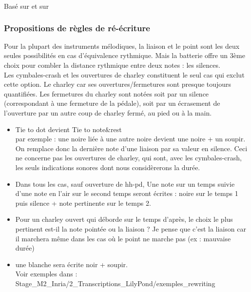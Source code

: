Basé sur \cite{jacquemard:hal-01134096} et sur \cite{jacquemard:hal-01403982}
\subsubsection*{Propositions de règles de ré-écriture}
Pour la plupart des instruments mélodiques, la liaison et le point sont les deux seules possibilités en cas d’équivalence rythmique. Mais la batterie offre un 3ème choix pour combler la distance rythmique entre deux notes : les silences.\\Les cymbales-crash et les ouvertures de charley constituent le seul cas qui exclut cette option. Le charley car ses ouvertures/fermetures sont presque toujours quantifiées. Les fermetures du charley sont notées soit par un silence (correspondant à une fermeture de la pédale), soit par un écrasement de l’ouverture par un autre coup de charley fermé, au pied ou à la main.
\begin{itemize}
\item 
Tie to dot devient Tie to note\&rest\\
par exemple : une noire liée à une autre noire devient une noire + un soupir.\\
On remplace donc la dernière note d’une liaison par sa valeur en silence.
Ceci ne concerne pas les ouvertures de charley, qui sont, avec les cymbales-crash, les seuls indications sonores dont nous considèrerons la durée.
\item 
Dans tous les cas, sauf ouverture de hh-pd, Une note sur un temps suivie d’une note en l’air sur le second temps seront écrites : noire sur le temps 1 puis silence + note pertinente sur le temps 2.
\item
Pour un charley ouvert qui déborde sur le temps d’après, le choix le plus pertinent est-il la note pointée ou la liaison ? Je pense que c’est la liaison car il marchera même dans les cas où le point ne marche pas (ex : mauvaise durée)
\item
une blanche sera écrite noir + soupir.\\
Voir exemples dans :
Stage\_M2\_Inria/2\_Transcriptions\_LilyPond/exemples\_rewriting
\end{itemize}
